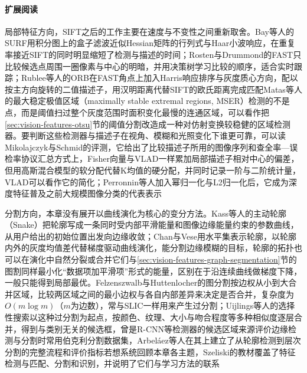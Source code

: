 \paragraph{扩展阅读}
局部特征方向，SIFT之后的工作主要在速度与不变性之间重新取舍。Bay等人的SURF用积分图上的盒子滤波近似Hessian矩阵的行列式与Haar小波响应，在重复率接近SIFT的同时明显缩短了检测与描述的时间；Rosten与Drummond的FAST只比较候选点周围一圈像素与中心的明暗，并用决策树学习比较的顺序，适合实时跟踪；Rublee等人的ORB在FAST角点上加入Harris响应排序与灰度质心方向，配以按主方向旋转的二值描述子，用汉明距离代替SIFT的欧氏距离完成匹配Matas等人的最大稳定极值区域（maximally stable extremal regions, MSER）检测的不是点，而是阈值扫过整个灰度范围时面积变化最慢的连通区域，可以看作把\ref{sec:vision-features-otsu}节的阈值分割改造成一种对仿射变换较稳健的区域检测器。要判断这些检测器与描述子在视角、模糊和光照变化下谁更可靠，可以读Mikolajczyk与Schmid的评测，它给出了比较描述子所用的图像序列和查全率—误检率协议汇总方式上，Fisher向量与VLAD一样累加局部描述子相对中心的偏差，但用高斯混合模型的软分配代替K均值的硬分配，并同时记录一阶与二阶统计量，VLAD可以看作它的简化；Perronnin等人加入幂归一化与L2归一化后，它成为深度特征普及之前大规模图像分类的代表表示

分割方向，本章没有展开以曲线演化为核心的变分方法。Kass等人的主动轮廓（Snake）把轮廓写成一条同时受内部平滑能量和图像边缘能量约束的参数曲线，从用户给出的初始位置出发向边缘收敛；Chan与Vese用水平集表示轮廓，以轮廓内外的灰度均值差代替梯度驱动曲线演化，能分割边缘模糊的目标，轮廓的拓扑也可以在演化中自然分裂或合并它们与\ref{sec:vision-features-graph-segmentation}节的图割同样最小化“数据项加平滑项”形式的能量，区别在于沿连续曲线做梯度下降，一般只能得到局部最优。Felzenszwalb与Huttenlocher的图分割按边权从小到大合并区域，比较两区域之间的最小边权与各自内部差异来决定是否合并，复杂度为$O(m\log m)$（$m$为边数），常与SLIC一样用来产生过分割；Uijlings等人的选择性搜索以这种过分割为起点，按颜色、纹理、大小与吻合程度等多种相似度逐层合并，得到与类别无关的候选框，曾是R-CNN等检测器的候选区域来源评价边缘检测与分割时常用伯克利分割数据集，Arbeláez等人在其上建立了从轮廓检测到层次分割的完整流程和评价指标若想系统回顾本章各主题，Szeliski的教材覆盖了特征检测与匹配、分割和识别，并说明了它们与学习方法的联系
